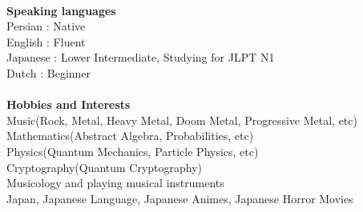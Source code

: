 \documentclass[12pt,a4paper]{article}
\begin{document}
			\\
	\small \textbf{Speaking languages} \\
			 \indent Persian : Native \\
			 \indent English : Fluent \\
			 \indent Japanese : Lower Intermediate, Studying for JLPT N1 \\
			 \indent Dutch : Beginner \\
			 \\
	\small \textbf{Hobbies and Interests} \\
		     \indent Music(Rock, Metal, Heavy Metal, Doom Metal, Progressive Metal, etc) \\
         	 \indent Mathematics(Abstract Algebra, Probabilities, etc) \\
	         \indent Physics(Quantum Mechanics, Particle Physics, etc) \\
	         \indent Cryptography(Quantum Cryptography) \\
	         \indent Musicology and playing musical instruments \\
	         \indent Japan, Japanese Language, Japanese Animes, Japanese Horror Movies \\ \\ \\ \\
  
\end{document}
